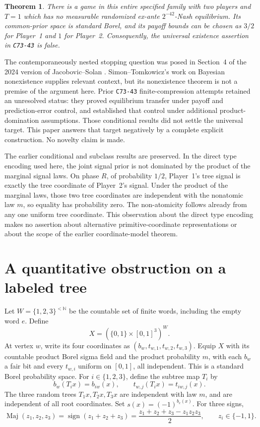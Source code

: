 \documentclass[11pt]{article}
\newtheorem{theorem}{Theorem}
\theoremstyle{remark}
\newcommand{\Maj}{\operatorname{Maj}}
\begin{document}
\begin{theorem}\label{thm:main}
There is a game in this entire specified family with two players and
$T=1$ which has no measurable randomized ex-ante $2^{-42}$-Nash
equilibrium. Its common-prior space is standard Borel, and its payoff
bounds can be chosen as $3/2$ for Player~1 and $1$ for Player~2.
Consequently, the universal existence assertion in
\texttt{C73-43} is false.
\end{theorem}

The contemporaneously nested stopping question was posed in
Section~4 of the 2024 version of Jacobovic--Solan
\cite{JS}. Simon--Tomkowicz's work on Bayesian nonexistence
\cite{ST} supplies relevant context, but its nonexistence theorem is not
a premise of the argument here. Prior \texttt{C73-43} finite-compression
attempts retained an unresolved status: they proved equilibrium transfer
under payoff and prediction-error control, and established that control
under additional product-domination assumptions. Those conditional
results did not settle the universal target. This paper answers that
target negatively by a complete explicit construction. No novelty claim
is made.

The earlier conditional and subclass results are preserved. In the direct
type encoding used here, the joint signal prior is not dominated by the
product of the marginal signal laws. On phase
$R$, of probability $1/2$, Player~1's tree signal is exactly the tree
coordinate of Player~2's signal. Under the product of the marginal laws,
those two tree coordinates are independent with the nonatomic law $m$,
so equality has probability zero. The non-atomicity follows already from
any one uniform tree coordinate. This observation about the direct type
encoding makes no assertion about alternative primitive-coordinate
representations or about the scope of the earlier coordinate-model
theorem.

\section{A quantitative obstruction on a labeled tree}

Let $W=\{1,2,3\}^{<\mathbb N}$ be the countable set of finite words,
including the empty word $e$. Define
\[
 X=(\{0,1\}\times[0,1]^3)^W.
\]
At vertex $w$, write its four coordinates as
$(b_w,t_{w,1},t_{w,2},t_{w,3})$. Equip $X$ with its countable product
Borel sigma field and the product probability $m$, with each $b_w$ a
fair bit and every $t_{w,i}$ uniform on $[0,1]$, all independent.
This is a standard Borel probability space. For $i\in\{1,2,3\}$,
define the subtree map $T_i$ by
\[
 b_w(T_i x)=b_{iw}(x),\qquad
 t_{w,j}(T_i x)=t_{iw,j}(x).
\]
The three random trees $T_1x,T_2x,T_3x$ are independent with law $m$,
and are independent of all root coordinates. Set
$s(x)=(-1)^{b_e(x)}$. For three signs,
\[
 \Maj(z_1,z_2,z_3)=\operatorname{sign}(z_1+z_2+z_3)
 =\frac{z_1+z_2+z_3-z_1z_2z_3}{2},
 \qquad z_i\in\{-1,1\}.
\]
\end{document}
